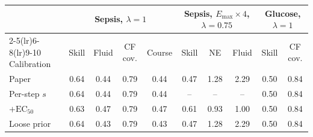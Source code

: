 \begin{tabular}{lccccccccc}
\toprule
 & \multicolumn{4}{c}{Sepsis, $\lambda=1$} & \multicolumn{3}{c}{Sepsis, $E_{\max}\times4$, $\lambda=0.75$} & \multicolumn{2}{c}{Glucose, $\lambda=1$} \\
\cmidrule(lr){2-5}\cmidrule(lr){6-8}\cmidrule(lr){9-10}
Calibration & Skill & Fluid & CF cov. & Course & Skill & NE & Fluid & Skill & CF cov. \\
\midrule
Paper & 0.64 & 0.44 & 0.79 & 0.44 & 0.47 & 1.28 & 2.29 & 0.50 & 0.84 \\
Per-step $s$ & 0.64 & 0.44 & 0.79 & 0.44 & -- & -- & -- & 0.50 & 0.84 \\
$+\mathrm{EC}_{50}$ & 0.63 & 0.47 & 0.79 & 0.47 & 0.61 & 0.93 & 1.00 & 0.50 & 0.84 \\
Loose prior & 0.64 & 0.43 & 0.79 & 0.43 & 0.47 & 1.28 & 2.29 & 0.50 & 0.84 \\
\bottomrule
\end{tabular}
